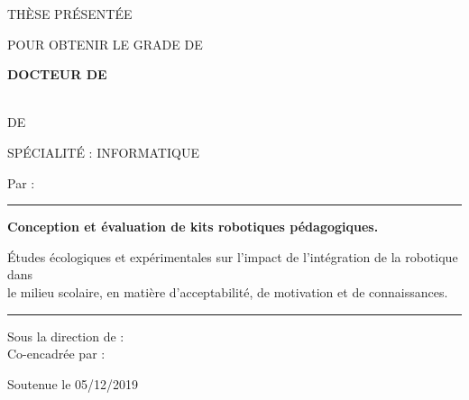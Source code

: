\begin{center}
TH\`{E}SE PR\'{E}SENT\'{E}E

POUR OBTENIR LE GRADE DE

\vspace{0.5cm}
\textbf{{\large DOCTEUR DE}}
\vspace{0.1cm}

\\
\vspace{0.62cm}
 DE\\
\vspace{0.25cm}

SP\'{E}CIALIT\'{E} : INFORMATIQUE 
\vspace{0.75cm}

Par : {\large{}}
\vspace{0.7cm}

\hrule

\vspace{1cm}

\textbf{\large Conception et évaluation de kits robotiques pédagogiques.}
\vspace{0.35cm}

{Études écologiques et expérimentales sur l'impact de l'intégration de la robotique dans\\le milieu scolaire, en matière d'acceptabilité, de motivation et de connaissances.}
\vspace{0.9cm}

\hrule

\vspace{0.62cm}
Sous la direction de : \\
\vspace{0.15cm}
Co-encadrée par : \\
\vspace{0.42cm}

Soutenue le 05/12/2019
\vspace{0.42cm}


\end{center}
